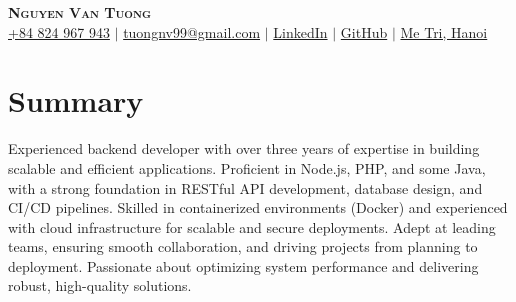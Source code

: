 \documentclass[letterpaper,11pt]{article}
\newcommand{\resumeSubHeadingListStart}{\begin{itemize}[leftmargin=0.15in, label={}]}
\newcommand{\resumeSubHeadingListEnd}{\end{itemize}}
\begin{document}

\begin{center}
    \textbf{\Huge \scshape Nguyen Van Tuong} \\ \vspace{10pt}
    \small
    \faMobile \hspace{.5pt} \href{tel:84824967943}{+84 824 967 943}
    $|$
    \faAt \hspace{.5pt} \href{mailto:tuongnv99@gmail.com}{tuongnv99@gmail.com}
    $|$
    \faLinkedinSquare \hspace{.5pt} \href{https://www.linkedin.com/in/tuongnv}{LinkedIn}
    $|$
    \faGithub \hspace{.5pt} \href{https://github.com/tuongnv99}{GitHub}
    $|$
    \faMapMarker \hspace{.5pt} \href{https://maps.app.goo.gl/7cBHvJBrCku3NF1v7}{Me Tri, Hanoi}
\end{center}



\section{Summary}
  \vspace{2pt}
  \resumeSubHeadingListStart
    \small{\item{
        \hspace{10pt}
        { Experienced backend developer with over three years of expertise in building scalable and efficient applications. Proficient in Node.js, PHP, and some Java, with a strong foundation in RESTful API development, database design, and CI/CD pipelines. Skilled in containerized environments (Docker) and experienced with cloud infrastructure for scalable and secure deployments. Adept at leading teams, ensuring smooth collaboration, and driving projects from planning to deployment. Passionate about optimizing system performance and delivering robust, high-quality solutions.}
    }}
  \resumeSubHeadingListEnd



\end{document}
